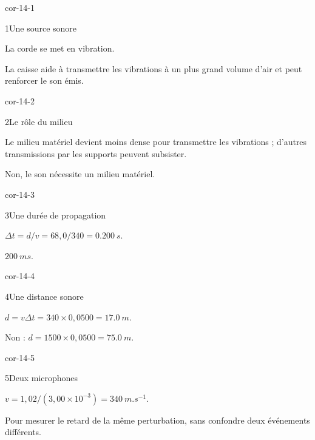 \clearpage{}
\corrigesSouples
\begin{blocLivre}{cor-14-1}\begin{corrige}{1}{Une source sonore}
\begin{questions}
\item La corde se met en vibration.
\item La caisse aide à transmettre les vibrations à un plus grand volume d’air et peut renforcer le son émis.
\end{questions}
\end{corrige}\end{blocLivre}
\begin{blocLivre}{cor-14-2}\begin{corrige}{2}{Le rôle du milieu}
\begin{questions}
\item Le milieu matériel devient moins dense pour transmettre les vibrations ; d’autres transmissions par les supports peuvent subsister.
\item Non, le son nécessite un milieu matériel.
\end{questions}
\end{corrige}\end{blocLivre}
\begin{blocLivre}{cor-14-3}\begin{corrige}{3}{Une durée de propagation}
\begin{questions}
\item $\Delta t=d/v=68,0/340=\qty{0,200}{s}$.
\item $\qty{200}{ms}$.
\end{questions}
\end{corrige}\end{blocLivre}
\begin{blocLivre}{cor-14-4}\begin{corrige}{4}{Une distance sonore}
\begin{questions}
\item $d=v\Delta t=340\times0,0500=\qty{17,0}{m}$.
\item Non : $d=1500\times0,0500=\qty{75,0}{m}$.
\end{questions}
\end{corrige}\end{blocLivre}
\begin{blocLivre}{cor-14-5}\begin{corrige}{5}{Deux microphones}
\begin{questions}
\item $v=1,02/(3,00\times10^{-3})=\qty{340}{m.s^{-1}}$.
\item Pour mesurer le retard de la même perturbation, sans confondre deux événements différents.
\end{questions}
\end{corrige}\end{blocLivre}

